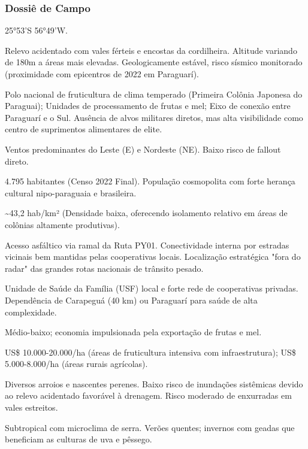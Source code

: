\subsubsection{Dossiê de Campo}
\begin{description}[style=nextline,leftmargin=0.5cm,font=\bfseries]
\item[Coordenadas]  25°53'S 56°49'W.
\item[Topografia]  Relevo acidentado com vales férteis e encostas da cordilheira. Altitude variando de 180m a áreas mais elevadas. Geologicamente estável, risco sísmico monitorado (proximidade com epicentros de 2022 em Paraguarí).
\item[Alvos Estratégicos]  Polo nacional de fruticultura de clima temperado (Primeira Colônia Japonesa do Paraguai); Unidades de processamento de frutas e mel; Eixo de conexão entre Paraguarí e o Sul. Ausência de alvos militares diretos, mas alta visibilidade como centro de suprimentos alimentares de elite.
\item[Fallout]  Ventos predominantes do Leste (E) e Nordeste (NE). Baixo risco de fallout direto.
\item[População]  4.795 habitantes (Censo 2022 Final). População cosmopolita com forte herança cultural nipo-paraguaia e brasileira.
\item[Densidade]  \textasciitilde 43,2 hab/\allowbreak km² (Densidade baixa, oferecendo isolamento relativo em áreas de colônias altamente produtivas).
\item[Vias de Acesso]  Acesso asfáltico via ramal da Ruta PY01. Conectividade interna por estradas vicinais bem mantidas pelas cooperativas locais. Localização estratégica "fora do radar" das grandes rotas nacionais de trânsito pesado.
\item[Serviços]  Unidade de Saúde da Família (USF) local e forte rede de cooperativas privadas. Dependência de Carapeguá (40 km) ou Paraguarí para saúde de alta complexidade.
\item[Custo de Vida]  Médio-baixo; economia impulsionada pela exportação de frutas e mel.
\item[Preço da Terra]  US\$ 10.000-20.000/\allowbreak ha (áreas de fruticultura intensiva com infraestrutura); US\$ 5.000-8.000/\allowbreak ha (áreas rurais agrícolas).
\item[Hidrologia]  Diversos arroios e nascentes perenes. Baixo risco de inundações sistêmicas devido ao relevo acidentado favorável à drenagem. Risco moderado de enxurradas em vales estreitos.
\item[Clima]  Subtropical com microclima de serra. Verões quentes; invernos com geadas que beneficiam as culturas de uva e pêssego.

\end{description}
